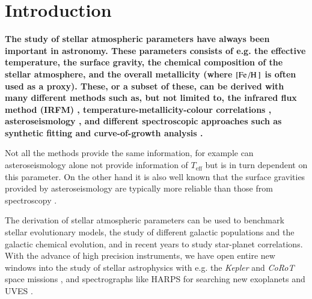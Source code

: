 \documentclass{aa}
\begin{document}
\maketitle



\section{Introduction}
\label{sec:introduction}

{\bf
The study of stellar atmospheric parameters have always been important in astronomy. These
parameters consists of e.g. the effective temperature, the surface gravity, the chemical composition
of the stellar atmosphere, and the overall metallicity (where $[\ion{Fe}/\ion{H}]$ is often used as
a proxy). These, or a subset of these, can be derived with many different methods such as, but not
limited to, the infrared flux method (IRFM) \citep{Blackwell1977}, temperature-metallicity-colour
correlations \citep[see e.g.][]{Ramirez2005b}, asteroseismology \citep[see][for a classic
example]{Kjeldsen1995}, and different spectroscopic approaches such as synthetic fitting \citep[see
e.g.][]{Onehag2012,Tsantaki2017} and curve-of-growth analysis \citep[see
e.g.][]{Sousa2008a,Andreasen2017a}.

Not all the methods provide the same information, for example can asteroseismology alone not provide
information of $T_\mathrm{eff}$ but is in turn dependent on this parameter. On the other hand it is
also well known that the surface gravities provided by asteroseismology are typically more reliable
than those from spectroscopy \citep[see e.g. the discussion by][]{Mortier2014}.

The derivation of stellar atmospheric parameters can be used to benchmark stellar evolutionary
models, the study of different galactic populations and the galactic chemical evolution, and in
recent years to study star-planet correlations. With the advance of high precision instruments, we
have open entire new windows into the study of stellar astrophysics with e.g. the \emph{Kepler} and
\emph{CoRoT} space missions \citep[see e.g.][]{Christensen-Dalsgaard2010,Chaplin2011,Huber2014}, and
spectrographs like HARPS for searching new exoplanets \citep{HARPS} and UVES \citep{UVES}.

}
\end{document}
